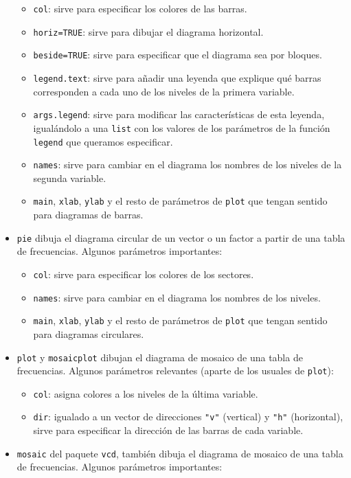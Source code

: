 \documentclass[]{book}
\providecommand{\tightlist}{%
  \setlength{\itemsep}{0pt}\setlength{\parskip}{0pt}}
\theoremstyle{definition}
\theoremstyle{definition}
\theoremstyle{definition}
\theoremstyle{remark}
\begin{document}
\begin{itemize}
  \begin{itemize}
  \tightlist
  \item
    \texttt{col}: sirve para especificar los colores de las barras.
  \item
    \texttt{horiz=TRUE}: sirve para dibujar el diagrama horizontal.
  \item
    \texttt{beside=TRUE}: sirve para especificar que el diagrama sea por bloques.
  \item
    \texttt{legend.text}: sirve para añadir una leyenda que explique qué barras corresponden a cada uno de los niveles de la primera variable.
  \item
    \texttt{args.legend}: sirve para modificar las características de esta leyenda, igualándolo a una \texttt{list} con los valores de los parámetros de la función \texttt{legend} que queramos especificar.
  \item
    \texttt{names}: sirve para cambiar en el diagrama los nombres de los niveles de la segunda variable.
  \item
    \texttt{main}, \texttt{xlab}, \texttt{ylab} y el resto de parámetros de \texttt{plot} que tengan sentido para diagramas de barras.
  \end{itemize}
\item
  \texttt{pie} dibuja el diagrama circular de un vector o un factor a partir de una tabla de frecuencias. Algunos parámetros importantes:

  \begin{itemize}
  \tightlist
  \item
    \texttt{col}: sirve para especificar los colores de los sectores.
  \item
    \texttt{names}: sirve para cambiar en el diagrama los nombres de los niveles.
  \item
    \texttt{main}, \texttt{xlab}, \texttt{ylab} y el resto de parámetros de \texttt{plot} que tengan sentido para diagramas circulares.
  \end{itemize}
\item
  \texttt{plot} y \texttt{mosaicplot} dibujan el diagrama de mosaico de una tabla de frecuencias. Algunos parámetros relevantes (aparte de los usuales de \texttt{plot}):

  \begin{itemize}
  \tightlist
  \item
    \texttt{col}: asigna colores a los niveles de la última variable.
  \item
    \texttt{dir}: igualado a un vector de direcciones \texttt{"v"} (vertical) y \texttt{"h"} (horizontal), sirve para especificar la dirección de las barras de cada variable.
  \end{itemize}
\item
  \texttt{mosaic} del paquete \texttt{vcd}, también dibuja el diagrama de mosaico de una tabla de frecuencias. Algunos parámetros importantes:


\end{itemize}
\end{document}
